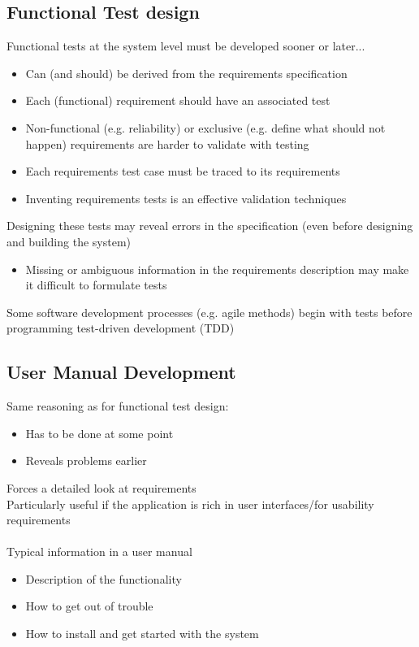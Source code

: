 \documentclass{article}[18pt]
\begin{document}
\subsection{Functional Test design}
Functional tests at the system level must be developed sooner or later...
\begin{itemize}
	\item Can (and should) be derived from the requirements specification
	\item Each (functional) requirement should have an associated test
	\item Non-functional (e.g. reliability) or exclusive (e.g. define what should not happen) requirements are harder to validate with testing
	\item Each requirements test case must be traced to its requirements
	\item Inventing requirements tests is an effective validation techniques
\end{itemize}
Designing these tests may reveal errors in the specification (even before designing and building the system)
\begin{itemize}
	\item Missing or ambiguous information in the requirements description may make it difficult to formulate tests
\end{itemize}
Some software development processes (e.g. agile methods) begin with tests before programming test-driven development (TDD)
\subsection{User Manual Development}
Same reasoning as for functional test design:
\begin{itemize}
	\item Has to be done at some point
	\item Reveals problems earlier
\end{itemize}
Forces a detailed look at requirements\\
Particularly useful if the application is rich in user interfaces/for usability requirements\\
\\
Typical information in a user manual
\begin{itemize}
	\item Description of the functionality
	\item How to get out of trouble
	\item How to install and get started with the system
\end{itemize}
\end{document}
